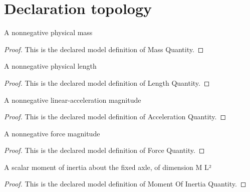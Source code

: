 \section{Declaration topology}
\begin{definition}
  \label{def:physics:phyx-mini-0785:phyxminiproblems-problemphyxmini0785-massquantity}
  A nonnegative physical mass
\end{definition}
\begin{proof}
  This is the declared model definition of Mass Quantity.
\end{proof}
\begin{definition}
  \label{def:physics:phyx-mini-0785:phyxminiproblems-problemphyxmini0785-lengthquantity}
  A nonnegative physical length
\end{definition}
\begin{proof}
  This is the declared model definition of Length Quantity.
\end{proof}
\begin{definition}
  \label{def:physics:phyx-mini-0785:phyxminiproblems-problemphyxmini0785-accelerationquantity}
  A nonnegative linear-acceleration magnitude
\end{definition}
\begin{proof}
  This is the declared model definition of Acceleration Quantity.
\end{proof}
\begin{definition}
  \label{def:physics:phyx-mini-0785:phyxminiproblems-problemphyxmini0785-forcequantity}
  A nonnegative force magnitude
\end{definition}
\begin{proof}
  This is the declared model definition of Force Quantity.
\end{proof}
\begin{definition}
  \label{def:physics:phyx-mini-0785:phyxminiproblems-problemphyxmini0785-momentofinertiaquantity}
  A scalar moment of inertia about the fixed axle, of dimension M L²
\end{definition}
\begin{proof}
  This is the declared model definition of Moment Of Inertia Quantity.
\end{proof}
